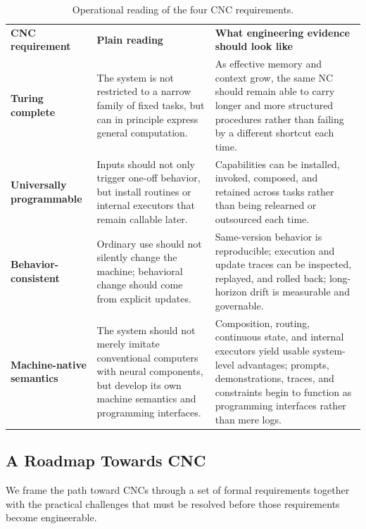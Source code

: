 \begin{table}[h]
  \centering
  \small
  \caption{Operational reading of the four CNC requirements.}
  \label{tab:cnc-operational}
  \setlength{\tabcolsep}{5pt}
  \renewcommand{\arraystretch}{1.08}
  \begin{tabularx}{\linewidth}{l X X}
    \toprule
    \rowcolor{tablewarmhead}
    \textbf{CNC requirement} & \textbf{Plain reading} & \textbf{What engineering evidence should look like} \\
    \textbf{Turing complete} & The system is not restricted to a narrow family of fixed tasks, but can in principle express general computation. & As effective memory and context grow, the same NC should remain able to carry longer and more structured procedures rather than failing by a different shortcut each time. \\
    \textbf{Universally programmable} & Inputs should not only trigger one-off behavior, but install routines or internal executors that remain callable later. & Capabilities can be installed, invoked, composed, and retained across tasks rather than being relearned or outsourced each time. \\
    \textbf{Behavior-consistent} & Ordinary use should not silently change the machine; behavioral change should come from explicit updates. & Same-version behavior is reproducible; execution and update traces can be inspected, replayed, and rolled back; long-horizon drift is measurable and governable. \\
    \textbf{Machine-native semantics} & The system should not merely imitate conventional computers with neural components, but develop its own machine semantics and programming interfaces. & Composition, routing, continuous state, and internal executors yield usable system-level advantages; prompts, demonstrations, traces, and constraints begin to function as programming interfaces rather than mere logs. \\
    \bottomrule
  \end{tabularx}
\end{table}

\subsection{A Roadmap Towards CNC}
\label{sec:roadmap}
We frame the path toward CNCs through a set of formal requirements together with the practical challenges that must be resolved before those requirements become engineerable.

